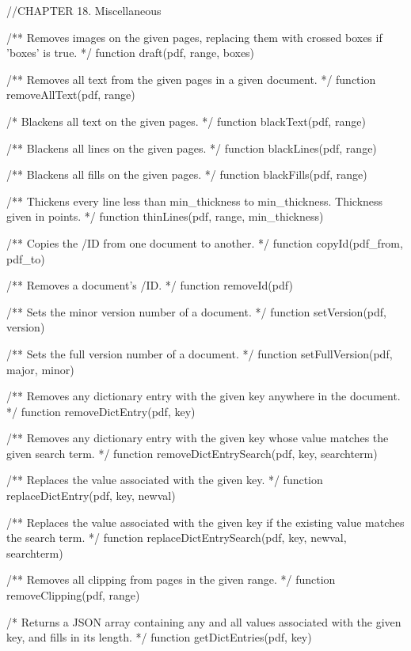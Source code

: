 //CHAPTER 18. Miscellaneous

/** Removes images on the given pages, replacing them with crossed boxes if
'boxes' is true. */
function draft(pdf, range, boxes)

/** Removes all text from the given pages in a given document. */
function removeAllText(pdf, range)

/* Blackens all text on the given pages. */
function blackText(pdf, range)

/** Blackens all lines on the given pages. */
function blackLines(pdf, range)

/** Blackens all fills on the given pages. */
function blackFills(pdf, range)

/** Thickens every line less than min_thickness to min_thickness. Thickness
given in points. */
function thinLines(pdf, range, min_thickness)

/** Copies the /ID from one document to another. */
function copyId(pdf_from, pdf_to)

/** Removes a document's /ID. */
function removeId(pdf)

/** Sets the minor version number of a document. */
function setVersion(pdf, version)

/** Sets the full version number of a document. */
function setFullVersion(pdf, major, minor)

/** Removes any dictionary entry with the given key anywhere in the document. */
function removeDictEntry(pdf, key)

/** Removes any dictionary entry with the given key whose value matches the
given search term. */
function removeDictEntrySearch(pdf, key, searchterm)

/** Replaces the value associated with the given key. */
function replaceDictEntry(pdf, key, newval)

/** Replaces the value associated with the given key if the existing value
matches the search term. */
function replaceDictEntrySearch(pdf, key, newval, searchterm)

/** Removes all clipping from pages in the given range. */
function removeClipping(pdf, range)

/* Returns a JSON array containing any and all values associated with the
given key, and fills in its length. */
function getDictEntries(pdf, key)
